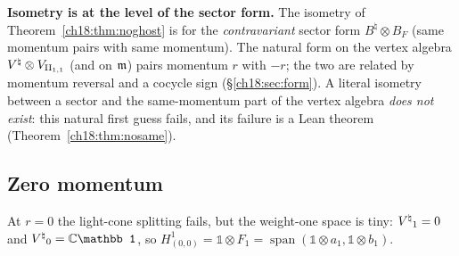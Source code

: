 \begin{warning}
\textbf{Isometry is at the level of the sector form.}  The isometry of Theorem~\ref{ch18:thm:noghost} is for the
\emph{contravariant} sector form $B^\natural\otimes B_F$ (same momentum pairs with same momentum).  The natural form
on the vertex algebra ${V^{\natural}}\otimes V_{\mathrm{II}_{1,1}}$ (and on $\mathfrak{m}$) pairs momentum $r$ with $-r$; the two are related
by momentum reversal and a cocycle sign (\S\ref{ch18:sec:form}).  A literal isometry between a sector and
the same-momentum part of the vertex algebra \emph{does not exist}: this natural first guess fails, and its failure is a
Lean theorem (Theorem~\ref{ch18:thm:nosame}).
\end{warning}

\subsection{Zero momentum}\label{ch18:sec:zero}

At $r=0$ the light-cone splitting fails, but the weight-one space is tiny: ${V^{\natural}}_1=0$ and $\Vnat_0=\mathbb C\mathbb 1$, so
$H^1_{(0,0)}=\mathbb 1\otimes F_1=\operatorname{span}(\mathbb 1\otimes a_1,\mathbb 1\otimes b_1)$.

